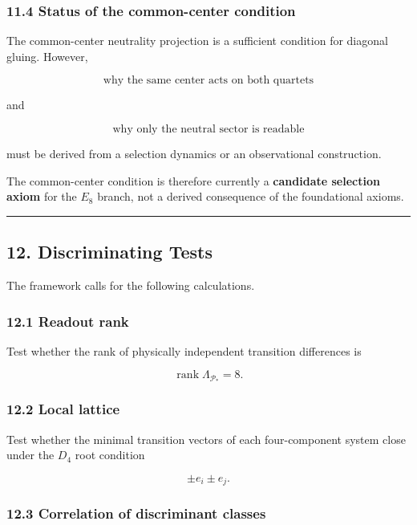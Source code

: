 \documentclass[
  a4paper,
]{article}
\begin{document}
\subsubsection{11.4 Status of the common-center
condition}\label{status-of-the-common-center-condition}

The common-center neutrality projection is a sufficient condition for
diagonal gluing. However,

\[
\text{why the same center acts on both quartets}
\]

and

\[
\text{why only the neutral sector is readable}
\]

must be derived from a selection dynamics or an observational
construction.

The common-center condition is therefore currently a \textbf{candidate
selection axiom} for the \(E_8\) branch, not a derived consequence of
the foundational axioms.

\begin{center}\rule{0.5\linewidth}{0.5pt}\end{center}

\subsection{12. Discriminating Tests}\label{discriminating-tests}

The framework calls for the following calculations.

\subsubsection{12.1 Readout rank}\label{readout-rank}

Test whether the rank of physically independent transition differences
is

\[
\operatorname{rank}\Lambda_{\mathcal P_*}
=8.
\]

\subsubsection{12.2 Local lattice}\label{local-lattice}

Test whether the minimal transition vectors of each four-component
system close under the \(D_4\) root condition

\[
\pm e_i\pm e_j.
\]

\subsubsection{12.3 Correlation of discriminant
classes}\label{correlation-of-discriminant-classes}
\end{document}
